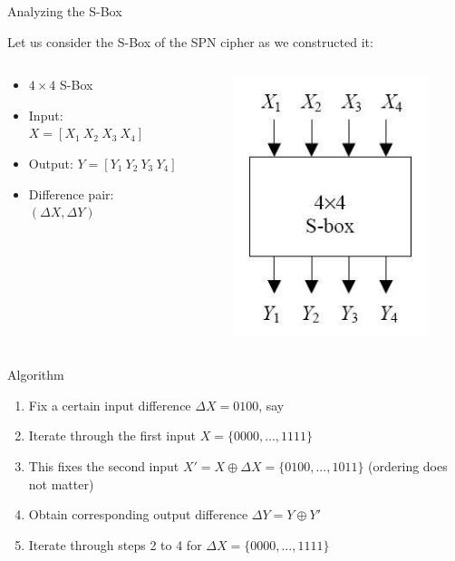 \documentclass[9pt]{beamer}
\begin{document}
\begin{frame}
Analyzing the S-Box

\vspace{2mm}
Let us consider the S-Box of the SPN cipher as we constructed it:
\begin{columns}
\begin{column}{0.5\textwidth}
\begin{itemize}
\item{$4 \times 4$ S-Box}
\item{Input: $X = [X_1 \: X_2 \: X_3 \: X_4]$}
\item{Output: $Y = [Y_1 \: Y_2 \: Y_3 \: Y_4]$}
\item{Difference pair: $(\Delta X, \Delta Y)$}
\end{itemize}
\end{column}
\begin{column}{0.5\textwidth}
\begin{figure}
\includegraphics[totalheight=0.3\textheight]{spn_sbox_unkeyed.jpg}
\end{figure}\end{column}
\end{columns}

\vspace{2mm}
\pause Algorithm
\begin{enumerate}[<+->]
\item{Fix a certain input difference $\Delta X = 0100$, say}
\item{Iterate through the first input $X = \{0000, ... ,1111 \}$}
\item{This fixes the second input $X' = X \oplus \Delta X = \{0100, ... ,1011\}$ (ordering does not matter)}
\item{Obtain corresponding output difference $\Delta Y = Y \oplus Y'$}
\item{Iterate through steps 2 to 4 for $\Delta X = \{0000, ... ,1111 \}$} 
\end{enumerate}
\end{frame}
\end{document}
